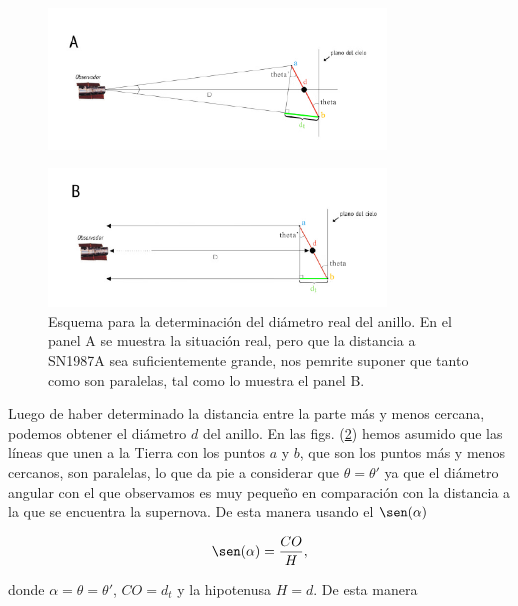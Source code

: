 \documentclass[paper=a4, fontsize=10pt]{scrartcl} %
\begin{document}
\begin{figure}[h]
\begin{center}
\includegraphics[width=0.8\textwidth]{fig_6_SN}
\label{fig:2.2} 
\end{center}
\end{figure}

\begin{figure}[h]
\begin{center}
\includegraphics[width=0.8\textwidth]{fig_6b_SN}
\caption{\small{Esquema para la determinación del diámetro real del anillo. En el panel A se muestra la situación real, pero que la distancia a SN1987A sea suficientemente grande, nos pemrite suponer que tanto {\color{ProcessBlue}{a }} como {\color{Goldenrod}{b }} son paralelas, tal como lo muestra el panel B.}}
\label{fig:2.2} 
\end{center}
\end{figure}



Luego de haber determinado la distancia entre la parte más y menos cercana, podemos obtener el diámetro $d$ del anillo. En las figs. (\ref{fig:2.2}) hemos asumido que las líneas que unen a la Tierra con los puntos $a$ y $b$, que son los puntos más y menos cercanos, son paralelas, lo que da pie a considerar que $\theta = \theta'$ ya que el diámetro angular con el que observamos es muy pequeño en comparación con la distancia a la que se encuentra la supernova. De esta manera usando el $\sen(\alpha)$ 

$$\sen(\alpha) = \frac{CO}{H},$$

donde $\alpha = \theta = \theta'$, $CO = d_t$ y la hipotenusa $H = d$. De esta manera 
\end{document}
